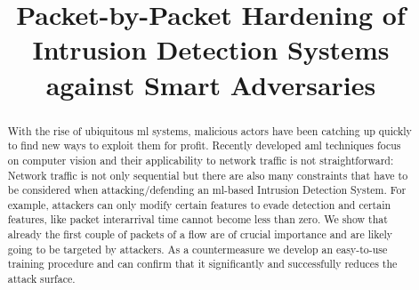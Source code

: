 \documentclass[conference]{IEEEtran}
\begin{document}
\title{Packet-by-Packet Hardening of Intrusion Detection Systems against Smart Adversaries}

\author{
}




\maketitle%

\thispagestyle{plain}
\pagestyle{plain}


\begin{abstract}

With the rise of ubiquitous \gls{ml} systems, malicious actors have been catching up quickly to find new ways to exploit them for profit. Recently developed \gls{aml} techniques focus on computer vision and their applicability to network traffic is not straightforward: Network traffic is not only sequential but there are also many constraints that have to be considered when attacking/defending an \gls{ml}-based Intrusion Detection System. For example, attackers can only modify certain features to evade detection and certain features, like packet interarrival time cannot become less than zero. We show that already the first couple of packets of a flow are of crucial importance and are likely going to be targeted by attackers. As a countermeasure we develop an easy-to-use training procedure and can confirm that it significantly and successfully reduces the attack surface. 

\end{abstract}
\end{document}
